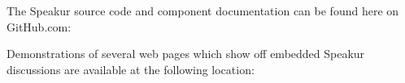 
The Speakur source code and component documentation can be found here on GitHub.com:


Demonstrations of several web pages which show off embedded Speakur discussions are available at the following location:

